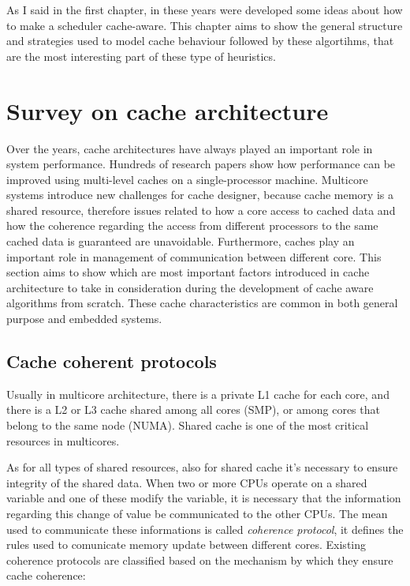 As I said in the first chapter, in these years were developed some ideas about how to make a scheduler cache-aware.
This chapter aims to show the general structure and strategies used to model cache behaviour followed by these algortihms, that are the most interesting 
part of these type of heuristics.

\section{Survey on cache architecture}
\label{sec:s1}

Over the years, cache architectures have always played an important role in system performance. Hundreds of research papers show how performance
can be improved using multi-level caches on a single-processor machine. Multicore systems introduce new challenges for cache designer, because cache memory 
is a shared resource, therefore issues related to how a core access to cached data and how the coherence regarding the access from different processors 
to the same cached data is guaranteed are unavoidable. Furthermore, caches play an important role in management of communication between different core.
This section aims to show which are most important factors introduced in cache architecture to take in consideration during the development of cache aware
algorithms from scratch. These cache characteristics are common in both general purpose and embedded systems.

\subsection{Cache coherent protocols}

Usually in multicore architecture, there is a private L1 cache for each core, and there is a L2 or L3 cache shared among all cores (SMP), or among cores 
that belong to the same node (NUMA). Shared cache is one of the most critical resources in multicores.

As for all types of shared resources, also for shared cache it's necessary to ensure integrity of the shared data.
When two or more CPUs operate on a shared variable and one of these  modify the variable, it is necessary that the information regarding
this change of value be communicated to the other CPUs. The mean used to communicate these informations is called \textit{coherence protocol}, it defines 
the rules used to comunicate memory update between different cores. Existing coherence protocols are classified based on the mechanism by which they ensure 
cache coherence: 

